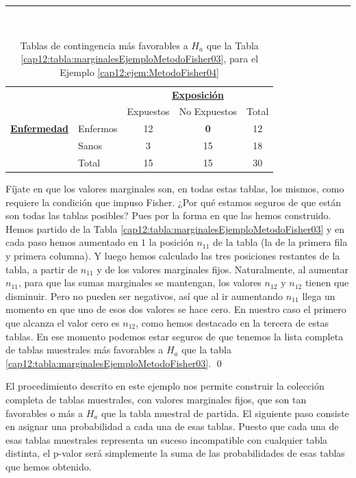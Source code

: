\begin{ejemplo}
\begin{table}[h!]
\begin{center}
            \hrule
            \quad\\[3mm]

            \begin{tabular}{llccc}
            &&\multicolumn{3}{c}{\underline{\bf Exposición}}\\

                                      &          & Expuestos &  No Expuestos& Total\\
            \cline{2-5}
          \underline{\bf Enfermedad} & Enfermos & 12& \rule{0mm}{4mm} {\Large\bf 0}&   12\\
                                      & Sanos &   3& 15&  18\\
            \cline{2-5}
                                      & Total    & 15& 15& 30\\
            \cline{2-5}
            \end{tabular}

        \end{center}
        \caption{Tablas de contingencia más favorables a $H_a$ que la Tabla \ref{cap12:tabla:marginalesEjemploMetodoFisher03}, para el Ejemplo \ref{cap12:ejem:MetodoFisher04}}
        \label{cap12:tabla:marginalesEjemploMetodoFisher04}
        \end{table}

Fíjate en que los valores marginales son, en todas estas tablas, los mismos, como requiere la condición que impuso Fisher. ¿Por qué estamos seguros de que están son todas las tablas posibles? Pues por la forma en que las hemos construido.  Hemos partido de la Tabla \ref{cap12:tabla:marginalesEjemploMetodoFisher03} y en cada paso hemos aumentado en $1$ la posición $n_{11}$ de la tabla (la de la primera fila y primera columna). Y luego hemos calculado las tres posiciones restantes de la tabla, a partir de $n_{11}$ y de los valores marginales fijos. Naturalmente, al aumentar $n_{11}$, para que las sumas marginales se mantengan, los valores $n_{12}$ y $n_{12}$ tienen que disminuir. Pero no pueden ser negativos, así que al ir aumentando $n_{11}$ llega un momento en que uno de esos dos valores se hace cero. En nuestro caso el primero que alcanza el valor cero es $n_{12}$, como hemos destacado en la tercera de estas tablas. En ese momento podemos estar seguros de que tenemos la lista completa de tablas muestrales más favorables a $H_a$ que la tabla \ref{cap12:tabla:marginalesEjemploMetodoFisher03}.
\qed
\end{ejemplo}

El procedimiento descrito en este ejemplo nos permite construir la colección completa de tablas muestrales, con valores marginales fijos, que son tan favorables o más a $H_a$ que la tabla muestral de partida. El siguiente paso consiste en asignar una probabilidad a cada una de esas tablas. Puesto que cada una de esas tablas muestrales representa un suceso incompatible con cualquier tabla distinta, el p-valor será simplemente la suma de las probabilidades de esas tablas que hemos obtenido.

